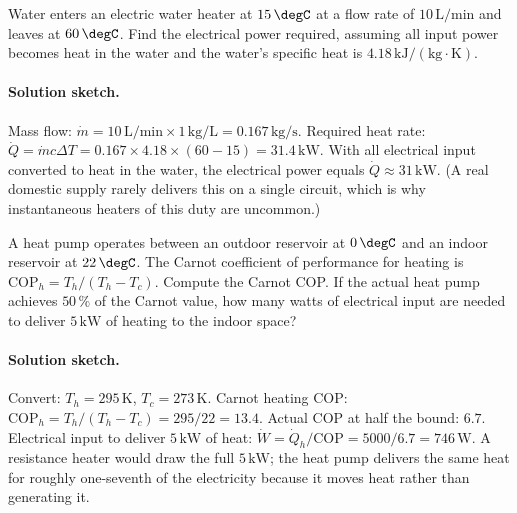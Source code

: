\begin{exercise}
Water enters an electric water heater at $15\,\degC$ at a flow rate of
$10\,\text{L}/\text{min}$ and leaves at $60\,\degC$. Find the
electrical power required, assuming all input power becomes heat in
the water and the water's specific heat is $4.18\,\text{kJ}/(\text{kg}
\cdot\si{\kelvin})$.
\paragraph{Solution sketch.} Mass flow:
$\dot{m} = 10\,\text{L}/\text{min} \times 1\,\text{kg}/\text{L} =
0.167\,\text{kg}/\text{s}$. Required heat rate:
$\dot{Q} = \dot{m} c \Delta T = 0.167 \times 4.18 \times (60 - 15) =
31.4\,\text{kW}$. With all electrical input converted to heat in the
water, the electrical power equals $\dot{Q} \approx 31\,\text{kW}$.
(A real domestic supply rarely delivers this on a single circuit,
which is why instantaneous heaters of this duty are uncommon.)
\end{exercise}

\begin{exercise}
A heat pump operates between an outdoor reservoir at $0\,\degC$ and an
indoor reservoir at $22\,\degC$. The Carnot coefficient of performance
for heating is $\text{COP}_h = T_h/(T_h - T_c)$. Compute the Carnot
COP. If the actual heat pump achieves $50\,\%$ of the Carnot value,
how many watts of electrical input are needed to deliver $5\,\text{kW}$
of heating to the indoor space?
\paragraph{Solution sketch.} Convert: $T_h = 295\,\si{\kelvin}$,
$T_c = 273\,\si{\kelvin}$. Carnot heating COP:
$\text{COP}_h = T_h/(T_h - T_c) = 295/22 = 13.4$. Actual COP at half
the bound: $6.7$. Electrical input to deliver $5\,\text{kW}$ of heat:
$\dot{W} = \dot{Q}_h/\text{COP} = 5000/6.7 = 746\,\text{W}$. A
resistance heater would draw the full $5\,\text{kW}$; the heat pump
delivers the same heat for roughly one-seventh of the electricity
because it moves heat rather than generating it.
\end{exercise}

